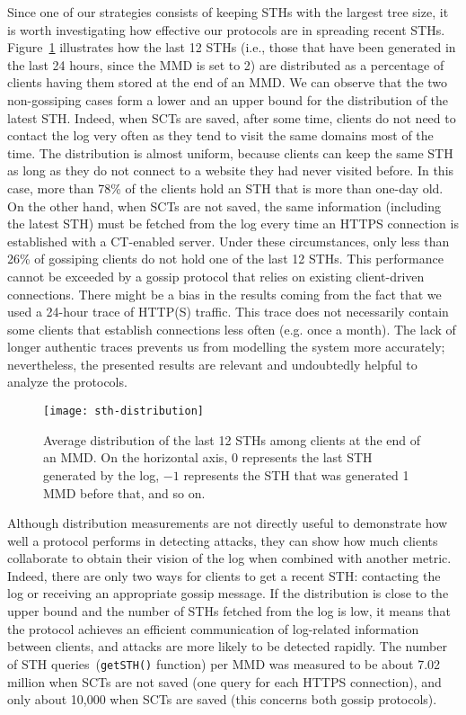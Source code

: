 Since one of our strategies consists of keeping STHs with the
largest tree size, it is worth investigating how effective our protocols are in spreading
recent STHs. Figure~\ref{fig:sth_distribution} illustrates how the last 12 STHs (i.e.,
those that have been generated in the last 24 hours, since the MMD is set to 2) are distributed
as a percentage of clients having them stored at the end of an MMD.
We can observe that the two non-gossiping cases form a lower
and an upper bound for the distribution of the latest STH. Indeed, when SCTs
are saved, after some time, clients do not need to contact the log very often as they tend
to visit the same domains most of the time. The distribution is almost
uniform, because clients can keep the same STH as long as they do not connect to a website
they had never visited before. In this case, more than 78\% of the clients hold an STH 
that is more than one-day old. On the other hand, when SCTs are not saved, the same
information (including the latest STH) must be fetched from the log every time an HTTPS
connection is established with a CT-enabled server. Under these circumstances, 
only less than 26\% of gossiping clients do not hold one of the last 12 STHs.
This performance cannot be exceeded by a gossip protocol that relies on existing
client-driven connections.
There might be a bias in the results coming from the fact that we used a 24-hour trace of
HTTP(S) traffic. This trace does not necessarily contain some clients that establish connections
less often (e.g. once a month). The lack of longer authentic traces prevents us from modelling
the system more accurately; nevertheless, the presented results are relevant and undoubtedly
helpful to analyze the protocols.

\begin{figure}
\centering
\texttt{[image: sth-distribution]}
\caption{Average distribution of the last 12 STHs among clients at the end of an
MMD.  On the horizontal axis, $0$ represents the last STH generated by the log,
$-1$ represents the STH that was generated 1 MMD before that, and so on.}
\label{fig:sth_distribution}
\end{figure}

Although distribution measurements are not directly useful to demonstrate how well
a protocol performs in detecting attacks, they can show how much clients collaborate to obtain
their vision of the log when combined with another metric. Indeed, there are
only two ways for clients to get a recent STH: contacting the log or receiving an appropriate
gossip message. If the distribution is close to the upper bound and the number of STHs
fetched from the log is
low, it means that the protocol achieves an efficient communication of log-related information
between clients, and attacks are more likely to be detected rapidly. The number of STH
queries~(\texttt{getSTH()} function) per MMD was measured to be about 7.02 million when SCTs
are not saved (one query for each HTTPS connection), and only about 10,000 when SCTs are saved
(this concerns both gossip protocols).

